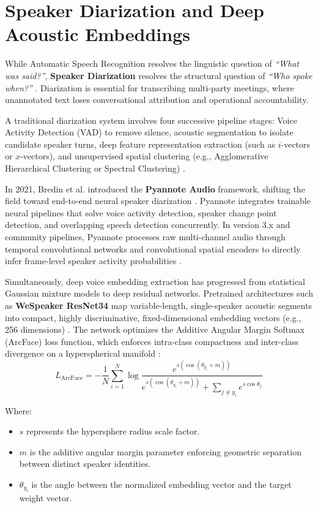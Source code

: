 \documentclass[12pt,oneside,letterpaper]{report}
\numberwithin{equation}{chapter} %
\begin{document}
\section{Speaker Diarization and Deep Acoustic Embeddings}
While Automatic Speech Recognition resolves the linguistic question of \textit{``What was said?''}, \textbf{Speaker Diarization} resolves the structural question of \textit{``Who spoke when?''} \cite{tranter2006overview}. Diarization is essential for transcribing multi-party meetings, where unannotated text loses conversational attribution and operational accountability.

A traditional diarization system involves four successive pipeline stages: Voice Activity Detection (VAD) to remove silence, acoustic segmentation to isolate candidate speaker turns, deep feature representation extraction (such as $i$-vectors or $x$-vectors), and unsupervised spatial clustering (e.g., Agglomerative Hierarchical Clustering or Spectral Clustering) \cite{snyder2018xvectors}.

In 2021, Bredin et al. introduced the \textbf{Pyannote Audio} framework, shifting the field toward end-to-end neural speaker diarization \cite{bredin2020pyannote}. Pyannote integrates trainable neural pipelines that solve voice activity detection, speaker change point detection, and overlapping speech detection concurrently. In version 3.x and community pipelines, Pyannote processes raw multi-channel audio through temporal convolutional networks and convolutional spatial encoders to directly infer frame-level speaker activity probabilities \cite{bredin2021endtoend}.

Simultaneously, deep voice embedding extraction has progressed from statistical Gaussian mixture models to deep residual networks. Pretrained architectures such as \textbf{WeSpeaker ResNet34} map variable-length, single-speaker acoustic segments into compact, highly discriminative, fixed-dimensional embedding vectors (e.g., 256 dimensions) \cite{wang2023wespeaker}. The network optimizes the Additive Angular Margin Softmax (ArcFace) loss function, which enforces intra-class compactness and inter-class divergence on a hyperspherical manifold \cite{deng2019arcface}:
\begin{equation}
L_{\text{ArcFace}} = -\frac{1}{N} \sum_{i=1}^N \log \frac{e^{s(\cos(\theta_{y_i} + m))}}{e^{s(\cos(\theta_{y_i} + m))} + \sum_{j \ne y_i} e^{s \cos \theta_j}}
\label{eq:arcface_loss}
\end{equation}

Where:
\begin{itemize}
    \item $s$ represents the hypersphere radius scale factor.
    \item $m$ is the additive angular margin parameter enforcing geometric separation between distinct speaker identities.
    \item $\theta_{y_i}$ is the angle between the normalized embedding vector and the target weight vector.
\end{itemize}
\end{document}
